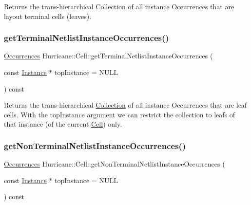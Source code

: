 Returns the trans-\/hierarchical \mbox{\hyperlink{classHurricane_1_1Collection}{Collection}} of all instance Occurrences that are layout terminal cells (leaves). \mbox{\label{classHurricane_1_1Cell_a6f559f7dab6e4afc0b60eba064c5e474}} 
\subsubsection{\texorpdfstring{get\+Terminal\+Netlist\+Instance\+Occurrences()}{getTerminalNetlistInstanceOccurrences()}}
{\footnotesize\ttfamily \mbox{\hyperlink{namespaceHurricane_a1912927c128eee859af62dbe4cbe0a6b}{Occurrences}} Hurricane\+::\+Cell\+::get\+Terminal\+Netlist\+Instance\+Occurrences (\begin{DoxyParamCaption}\item[{const \mbox{\hyperlink{classHurricane_1_1Instance}{Instance}} $\ast$}]{top\+Instance = {\ttfamily NULL} }\end{DoxyParamCaption}) const}

Returns the trans-\/hierarchical \mbox{\hyperlink{classHurricane_1_1Collection}{Collection}} of all instance Occurrences that are leaf cells. With the {\ttfamily top\+Instance} argument we can restrict the collection to leafs of that instance (of the current \mbox{\hyperlink{classHurricane_1_1Cell}{Cell}}) only. \mbox{\label{classHurricane_1_1Cell_a9e7a0536ec1efb23be2764068a85b6a7}} 
\subsubsection{\texorpdfstring{get\+Non\+Terminal\+Netlist\+Instance\+Occurrences()}{getNonTerminalNetlistInstanceOccurrences()}}
{\footnotesize\ttfamily \mbox{\hyperlink{namespaceHurricane_a1912927c128eee859af62dbe4cbe0a6b}{Occurrences}} Hurricane\+::\+Cell\+::get\+Non\+Terminal\+Netlist\+Instance\+Occurrences (\begin{DoxyParamCaption}\item[{const \mbox{\hyperlink{classHurricane_1_1Instance}{Instance}} $\ast$}]{top\+Instance = {\ttfamily NULL} }\end{DoxyParamCaption}) const}

